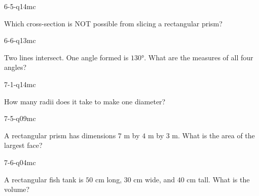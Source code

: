\begin{practiceQuestion}{6-5-q14}{mc}
\begin{questionText}
Which cross-section is NOT possible from slicing a rectangular prism?
\end{questionText}
\end{practiceQuestion}

\begin{practiceQuestion}{6-6-q13}{mc}
\begin{questionText}
Two lines intersect. One angle formed is $130°$. What are the measures of all four angles?
\end{questionText}
\end{practiceQuestion}

\begin{practiceQuestion}{7-1-q14}{mc}
\begin{questionText}
How many radii does it take to make one diameter?
\end{questionText}
\end{practiceQuestion}

\begin{practiceQuestion}{7-5-q09}{mc}
\begin{questionText}
A rectangular prism has dimensions $7$ m by $4$ m by $3$ m. What is the area of the largest face?
\end{questionText}
\end{practiceQuestion}

\begin{practiceQuestion}{7-6-q04}{mc}
\begin{questionText}
A rectangular fish tank is $50$ cm long, $30$ cm wide, and $40$ cm tall. What is the volume?
\end{questionText}
\end{practiceQuestion}

